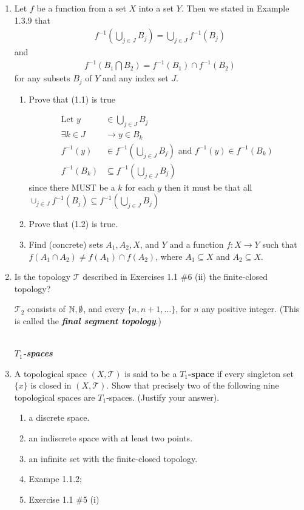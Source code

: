 \documentclass[10pt,a4paper]{report}
\newcommand{\SPECIAL}[1]{\begin{center}
	{\Large \textbf{\textit{\\#1}} }
\end{center}
}
\newcommand{\TT}{\mathcal{T}}
\begin{document}
\begin{enumerate}
	\item Let $f$ be a function from a set $X$ into a set $Y$.  Then we stated in Example 1.3.9 that
\begin{align}
	f^{-1}\left(\bigcup_{j\in J}B_j \right) = \bigcup_{j\in J}f^{-1}(B_j)
\end{align} and 
\begin{align}
	f^{-1}\left( B_1 \bigcap B_2\right) = f^{-1}(B_1)\cap f^{-1}(B_2)
\end{align} 
for any subsets $B_j$ of $Y$ and any index set $J$.
\begin{enumerate}
	\item Prove that (1.1) is true
	
	\begin{align*}
		\text{Let } y &\in \bigcup_{j \in J} B_j\\
		\exists k \in J &\to y \in B_k \\
		f^{-1}(y) &\in f^{-1}\left(\bigcup_{j\in J} B_j\right) \text{ and } f^{-1}(y) \in f^{-1}(B_k) \\
		f^{-1}(B_k) & \subseteq f^{-1}\left(\bigcup_{j\in J} B_j\right)
	\end{align*}since there MUST be a $k$ for each $y$ then it must be that all $\cup_{j\in J}f^{-1}(B_j) \subseteq f^{-1}\left(\bigcup_{j\in J} B_j\right)$
	
	\item Prove that (1.2) is true.
	\item Find (concrete) sets $A_1,A_2, X$, and $Y$ and a function $f: X \to Y$ such that $f(A_1\cap A_2)\ne f(A_1)\cap f(A_2)$, where $A_1 \subseteq X$ and $A_2 \subseteq X$.
\end{enumerate}

\item Is the topology $\TT$ described in Exercises 1.1 \#6 (ii) the finite-closed topology?

$\TT_2$ consists of $\mathbb{N},\emptyset$, and every $\{n, n+1, \dots\}$, for $n$ any positive integer. (This is called the \textbf{\textit{final segment topology}}.)

\SPECIAL{$T_1$-spaces}

\item A topological space $(X, \TT)$ is said to be a \textbf{$T_1$-space} if every singleton set $\{x\}$ is closed in $(X,\TT)$.  Show that precisely two of the following nine topological spaces are $T_1$-spaces. (Justify your answer).
\begin{enumerate}[label=(\roman*)]
	\item a discrete space.
	\item an indiscrete space with at least two points.
	\item an infinite set with the finite-closed topology.
	\item Exampe 1.1.2;
	\item Exercise 1.1 \#5 (i)
	

\end{enumerate}
\end{enumerate}
\end{document}
